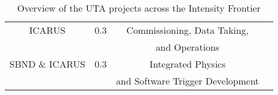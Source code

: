 \begin{center}
\begin{table}[htb]
\begin{center}
{\begin{tabular}{c|c|c|c}
  \cmidrule{1-3}   
  
  \multicolumn{1}{c|}{ICARUS} & \multicolumn{1}{|c|}{0.3} & \multicolumn{1}{|c|}{Commissioning, Data Taking, } &  \\
  \multicolumn{1}{c|}{} & \multicolumn{1}{|c|}{} & \multicolumn{1}{|c|}{and Operations} & \\
    
   \cmidrule{1-3} 
   
   \multicolumn{1}{c|}{SBND \& ICARUS} & \multicolumn{1}{|c|}{0.3} & \multicolumn{1}{|c|}{Integrated Physics } &  \\
  \multicolumn{1}{c|}{} & \multicolumn{1}{|c|}{} & \multicolumn{1}{|c|}{and Software Trigger Development} & \\ 
  
  \hline \hline
  
  \end{tabular}}
  \caption{Overview of the UTA projects across the Intensity Frontier} \label{tab:Timeline}
  \end{center}

\end{table}
\end{center}


